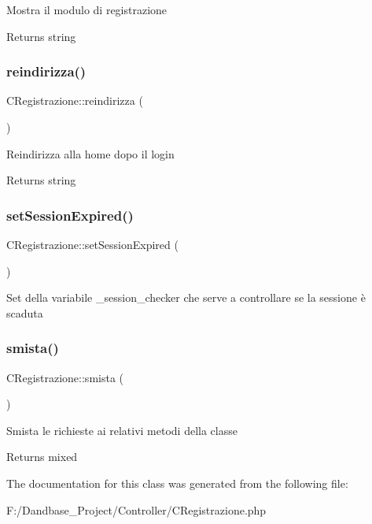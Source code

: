 Mostra il modulo di registrazione

\begin{DoxyReturn}{Returns}
string 
\end{DoxyReturn}
\mbox{\label{class_c_registrazione_aaf2b63786c125112efbb374fd6e102ba}} 
\subsubsection{\texorpdfstring{reindirizza()}{reindirizza()}}
{\footnotesize\ttfamily C\+Registrazione\+::reindirizza (\begin{DoxyParamCaption}{ }\end{DoxyParamCaption})}

Reindirizza alla home dopo il login

\begin{DoxyReturn}{Returns}
string 
\end{DoxyReturn}
\mbox{\label{class_c_registrazione_a499d6dfd36434599a9d2642c47ab4dcf}} 
\subsubsection{\texorpdfstring{set\+Session\+Expired()}{setSessionExpired()}}
{\footnotesize\ttfamily C\+Registrazione\+::set\+Session\+Expired (\begin{DoxyParamCaption}{ }\end{DoxyParamCaption})}

Set della variabile \+\_\+session\+\_\+checker che serve a controllare se la sessione è scaduta \mbox{\label{class_c_registrazione_a6f90c5c3fdb0f0dde421f89172f4bdd0}} 
\subsubsection{\texorpdfstring{smista()}{smista()}}
{\footnotesize\ttfamily C\+Registrazione\+::smista (\begin{DoxyParamCaption}{ }\end{DoxyParamCaption})}

Smista le richieste ai relativi metodi della classe

\begin{DoxyReturn}{Returns}
mixed 
\end{DoxyReturn}


The documentation for this class was generated from the following file\+:\begin{DoxyCompactItemize}
\item 
F\+:/\+Dandbase\+\_\+\+Project/\+Controller/C\+Registrazione.\+php\end{DoxyCompactItemize}

